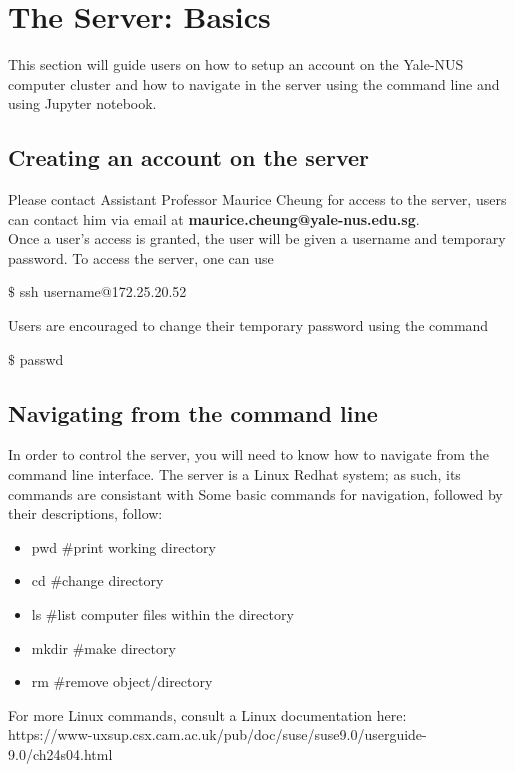 \chapter{The Server: Basics}

This section will guide users on how to setup an account on the Yale-NUS computer cluster and how to navigate in the server using the command line and using Jupyter notebook. 

\section{Creating an account on the server}

Please contact Assistant Professor Maurice Cheung for access to the server, users can contact him via email at \textbf{maurice.cheung@yale-nus.edu.sg}. \\

Once a user's access is granted, the user will be given a username and temporary password. To access the server, one can use

\begin{framed}
$\$$ ssh username@172.25.20.52
\end{framed}

Users are encouraged to change their temporary password using the command

\begin{framed}
$\$$ passwd
\end{framed}

\section{Navigating from the command line}
In order to control the server, you will need to know how to navigate from the command line interface. The server is a Linux Redhat system; as such, its commands are consistant with Some basic commands for navigation, followed by their descriptions, follow:
\begin{itemize}
\item pwd   \#print working directory
\item cd    \#change directory
\item ls    \#list computer files within the directory
\item mkdir \#make directory
\item rm    \#remove object/directory   
\end{itemize}
For more Linux commands, consult a Linux documentation here:\\
https://www-uxsup.csx.cam.ac.uk/pub/doc/suse/suse9.0/userguide-9.0/ch24s04.html

